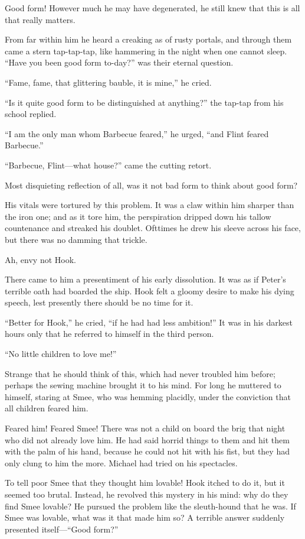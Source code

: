Good form! However much he may have degenerated, he still knew that
this is all that really matters.

From far within him he heard a creaking as of rusty portals, and
through them came a stern tap-tap-tap, like hammering in the night when
one cannot sleep. ``Have you been good form to-day?'' was their eternal
question.

``Fame, fame, that glittering bauble, it is mine,'' he cried.

``Is it quite good form to be distinguished at anything?'' the tap-tap
from his school replied.

``I am the only man whom Barbecue feared,'' he urged, ``and Flint feared
Barbecue.''

``Barbecue, Flint---what house?'' came the cutting retort.

Most disquieting reflection of all, was it not bad form to think about
good form?

His vitals were tortured by this problem. It was a claw within him
sharper than the iron one; and as it tore him, the perspiration dripped
down his tallow countenance and streaked his doublet. Ofttimes he drew
his sleeve across his face, but there was no damming that trickle.

Ah, envy not Hook.

There came to him a presentiment of his early dissolution. It was as if
Peter's terrible oath had boarded the ship. Hook felt a gloomy desire
to make his dying speech, lest presently there should be no time for
it.

``Better for Hook,'' he cried, ``if he had had less ambition!'' It was in
his darkest hours only that he referred to himself in the third person.

``No little children to love me!''

Strange that he should think of this, which had never troubled him
before; perhaps the sewing machine brought it to his mind. For long he
muttered to himself, staring at Smee, who was hemming placidly, under
the conviction that all children feared him.

Feared him! Feared Smee! There was not a child on board the brig that
night who did not already love him. He had said horrid things to them
and hit them with the palm of his hand, because he could not hit with
his fist, but they had only clung to him the more. Michael had tried on
his spectacles.

To tell poor Smee that they thought him lovable! Hook itched to do it,
but it seemed too brutal. Instead, he revolved this mystery in his
mind: why do they find Smee lovable? He pursued the problem like the
sleuth-hound that he was. If Smee was lovable, what was it that made
him so? A terrible answer suddenly presented itself---``Good form?''

